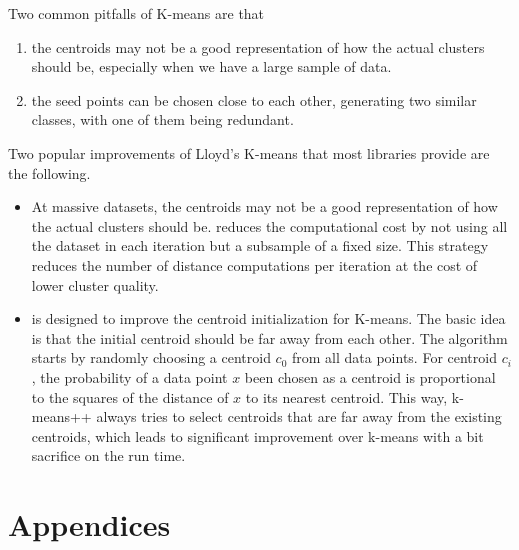 \documentclass[a4paper]{article}
\begin{document}
Two common pitfalls of K-means are that
\begin{enumerate}
    \item the centroids may not be a good representation of how the actual clusters should be, especially when we have a large sample of data.
    \item the seed points can be chosen close to each other, generating two similar classes, with one of them being redundant.
\end{enumerate}
Two popular improvements of Lloyd's K-means that most libraries provide are the following.
\begin{itemize}
    \item At massive datasets, the centroids may not be a good representation of how the actual clusters should be.  reduces the computational cost by not using all the dataset in each iteration but a subsample of a fixed size. This strategy reduces the number of distance computations per iteration at the cost of lower cluster quality.
    \item {} is designed to improve the centroid initialization for K-means. The basic idea is that the initial centroid should be far away from each other. The algorithm starts by randomly choosing a centroid $c_0$ from all data points. For centroid $c_i$, the probability of a data point $x$ been chosen as a centroid is proportional to the squares of the distance of $x$ to its nearest centroid. This way, k-means++ always tries to select centroids that are far away from the existing centroids, which leads to significant improvement over k-means with a bit sacrifice on the run time.
\end{itemize}



\newpage
\appendix

\section{Appendices}

\newpage
\end{document}
